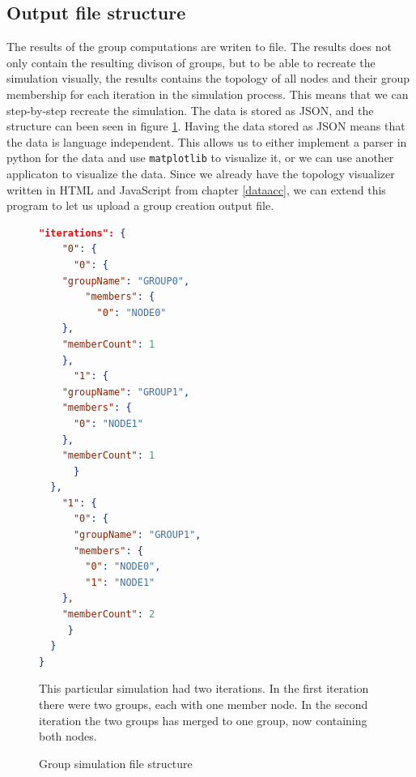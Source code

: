 \subsection{Output file structure}
The results of the group computations are writen to file. The results does not only contain the resulting divison of groups, but to be able to recreate the simulation
visually, the results contains the topology of all nodes and their group membership for each iteration in the simulation process. This means that we can step-by-step
recreate the simulation. The data is stored as JSON, and the structure can been seen in figure \ref{fig:jsongroup}.
Having the data stored as JSON means that the data is language independent. This allows us to either implement a parser in python for the data and use \verb|matplotlib| to visualize it,
or we can use another applicaton to visualize the data. Since we already have the topology visualizer
written in HTML and JavaScript from chapter \ref{dataacc}, we can extend this program to let us upload a group creation output file. 
\begin{figure}[H]

\begin{minipage}{\linewidth}
\begin{lstlisting}[language=json]
  "iterations": {
    "0": {
      "0": {
	"groupName": "GROUP0",
        "members": {
          "0": "NODE0"
	},
	"memberCount": 1
    },
      "1": {
	"groupName": "GROUP1",
	"members": {
	  "0": "NODE1"
	},
	"memberCount": 1
      }
  },
    "1": {
      "0": {
	  "groupName": "GROUP1",
	  "members": {
	    "0": "NODE0",
	    "1": "NODE1"
	},
	"memberCount": 2
     }
  }
}
\end{lstlisting}
\end{minipage}

\caption{Group simulation file structure}
\medskip
\small
This particular simulation had two iterations. In the first iteration there were two groups, each with one member node. In the second iteration the two groups has merged to one group, now
containing both nodes. 
\label{fig:jsongroup}
\end{figure}




